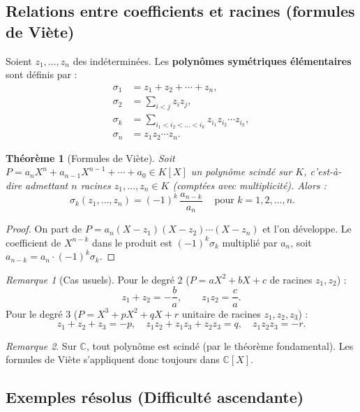 \documentclass[12pt,a4paper]{report}
\newtheorem{theoreme}{Théorème}[section]
\theoremstyle{definition}
\theoremstyle{remark}
\newtheorem{remarque}{Remarque}[section]
\begin{document}
\subsection{Relations entre coefficients et racines (formules de Viète)}

Soient $z_1, \dots, z_n$ des indéterminées. Les \textbf{polynômes symétriques élémentaires} sont définis par :
\begin{align*}
\sigma_1 &= z_1 + z_2 + \cdots + z_n, \\
\sigma_2 &= \sum_{i < j} z_i z_j, \\
\sigma_k &= \sum_{i_1 < i_2 < \dots < i_k} z_{i_1} z_{i_2} \cdots z_{i_k}, \\
\sigma_n &= z_1 z_2 \cdots z_n.
\end{align*}

\begin{theoreme}[Formules de Viète]
Soit $P = a_n X^n + a_{n-1} X^{n-1} + \cdots + a_0 \in K[X]$ un polynôme \emph{scindé} sur $K$, c'est-à-dire admettant $n$ racines $z_1, \dots, z_n \in K$ (comptées avec multiplicité). Alors :
\[ \boxed{\ \sigma_k(z_1, \dots, z_n) = (-1)^k\, \frac{a_{n-k}}{a_n}\ } \quad \text{pour } k = 1, 2, \dots, n. \]
\end{theoreme}

\begin{proof}
On part de $P = a_n (X - z_1)(X - z_2) \cdots (X - z_n)$ et l'on développe. Le coefficient de $X^{n-k}$ dans le produit est $(-1)^k \sigma_k$ multiplié par $a_n$, soit $a_{n-k} = a_n \cdot (-1)^k \sigma_k$.
\end{proof}

\begin{remarque}[Cas usuels]
Pour le degré 2 ($P = aX^2 + bX + c$ de racines $z_1, z_2$) :
\[ z_1 + z_2 = -\frac{b}{a}, \qquad z_1 z_2 = \frac{c}{a}. \]
Pour le degré 3 ($P = X^3 + pX^2 + qX + r$ unitaire de racines $z_1, z_2, z_3$) :
\[ z_1 + z_2 + z_3 = -p, \quad z_1 z_2 + z_1 z_3 + z_2 z_3 = q, \quad z_1 z_2 z_3 = -r. \]
\end{remarque}

\begin{remarque}
Sur $\mathbb{C}$, tout polynôme est scindé (par le théorème fondamental). Les formules de Viète s'appliquent donc toujours dans $\mathbb{C}[X]$.
\end{remarque}

\subsection{Exemples résolus (Difficulté ascendante)}
\end{document}
